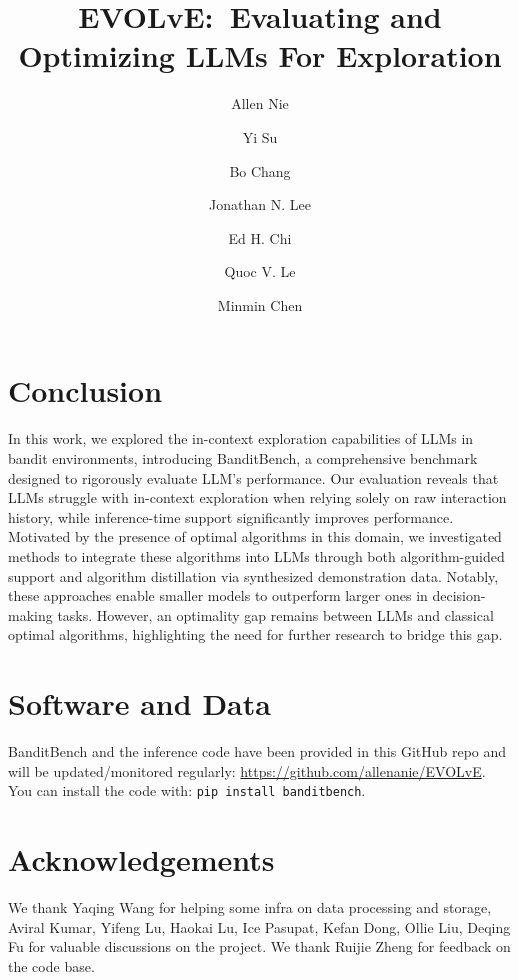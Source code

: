 \documentclass[11pt, logo]{googledeepmind}
\title{EVOLvE:~\textbf{Ev}aluating and \textbf{O}ptimizing \textbf{L}LMs For \textbf{E}xploration}
\author[$\blacklozenge$*,1]{Allen Nie}
\author[*,2]{Yi Su}
\author[*,2]{Bo Chang}
\author[2]{Jonathan N. Lee}
\author[2]{Ed H. Chi}
\author[2]{Quoc V. Le}
\author[2]{Minmin Chen}
\affil[*]{Equal contributions}
\affil[1]{Stanford University}
\affil[2]{Google DeepMind}
\affil[$\blacklozenge$]{Work done during an internship at Google DeepMind}
\theoremstyle{plain}
\theoremstyle{definition}
\begin{document}
\maketitle











\section{Conclusion}

In this work, we explored the in-context exploration capabilities of LLMs in bandit environments, introducing BanditBench, a comprehensive benchmark designed to rigorously evaluate LLM's performance. Our evaluation reveals that LLMs struggle with in-context exploration when relying solely on raw interaction history, while inference-time support significantly improves performance. Motivated by the presence of optimal algorithms in this domain, we investigated methods to integrate these algorithms into LLMs through both algorithm-guided support and algorithm distillation via synthesized demonstration data. Notably, these approaches enable smaller models to outperform larger ones in decision-making tasks. However, an optimality gap remains between LLMs and classical optimal algorithms, highlighting the need for further research to bridge this gap.

\section*{Software and Data}

BanditBench and the inference code have been provided in this GitHub repo and will be updated/monitored regularly: \url{https://github.com/allenanie/EVOLvE}. You can install the code with: \texttt{pip install banditbench}.

\section*{Acknowledgements}

We thank Yaqing Wang for helping some infra on data processing and storage, Aviral Kumar, Yifeng Lu, Haokai Lu, Ice Pasupat, Kefan Dong, Ollie Liu, Deqing Fu for valuable discussions on the project. We thank Ruijie Zheng for feedback on the code base.



\setcounter{figure}{0}
\renewcommand{\thefigure}{A\arabic{figure}}
\setcounter{table}{0}  %
\renewcommand{\thetable}{A\arabic{table}}

\appendix

\end{document}
